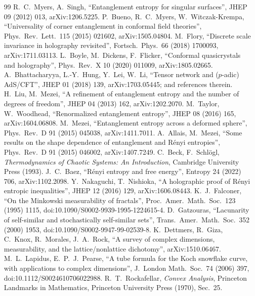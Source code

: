 \documentclass[11pt]{article}
\theoremstyle{definition}\newtheorem{definition}{Definition}[section]
\theoremstyle{remark}\newtheorem*{remark}{Remark}
\begin{document}
\begin{thebibliography}{99}
 R.~C.~Myers, A.~Singh, ``Entanglement entropy for singular surfaces'', JHEP 09 (2012) 013, arXiv:1206.5225.
 P.~Bueno, R.~C.~Myers, W.~Witczak-Krempa, ``Universality of corner entanglement in conformal field theories'', Phys.\ Rev.\ Lett.\ 115 (2015) 021602, arXiv:1505.04804.
 M.~Flory, ``Discrete scale invariance in holography revisited'', Fortsch.\ Phys.\ 66 (2018) 1700093, arXiv:1711.03113.
 L.~Boyle, M.~Dickens, F.~Flicker, ``Conformal quasicrystals and holography'', Phys.\ Rev.\ X 10 (2020) 011009, arXiv:1805.02665.
 A.~Bhattacharyya, L.-Y.~Hung, Y.~Lei, W.~Li, ``Tensor network and ($p$-adic) AdS/CFT'', JHEP 01 (2018) 139, arXiv:1703.05445; and references therein.
 H.~Liu, M.~Mezei, ``A refinement of entanglement entropy and the number of degrees of freedom'', JHEP 04 (2013) 162, arXiv:1202.2070.
 M.~Taylor, W.~Woodhead, ``Renormalized entanglement entropy'', JHEP 08 (2016) 165, arXiv:1604.06808.
 M.~Mezei, ``Entanglement entropy across a deformed sphere'', Phys.\ Rev.\ D 91 (2015) 045038, arXiv:1411.7011.
 A.~Allais, M.~Mezei, ``Some results on the shape dependence of entanglement and R\'enyi entropies'', Phys.\ Rev.\ D 91 (2015) 046002, arXiv:1407.7249.
 C.~Beck, F.~Schl\"ogl, \emph{Thermodynamics of Chaotic Systems: An Introduction}, Cambridge University Press (1993).
 J.~C.~Baez, ``R\'enyi entropy and free energy'', Entropy 24 (2022) 706, arXiv:1102.2098.
 Y.~Nakaguchi, T.~Nishioka, ``A holographic proof of R\'enyi entropic inequalities'', JHEP 12 (2016) 129, arXiv:1606.08443.
 K.~J.~Falconer, ``On the Minkowski measurability of fractals'', Proc.\ Amer.\ Math.\ Soc.\ 123 (1995) 1115, doi:10.1090/S0002-9939-1995-1224615-4.
 D.~Gatzouras, ``Lacunarity of self-similar and stochastically self-similar sets'', Trans.\ Amer.\ Math.\ Soc.\ 352 (2000) 1953, doi:10.1090/S0002-9947-99-02539-8.
 K.~Dettmers, R.~Giza, C.~Knox, R.~Morales, J.~A.~Rock, ``A survey of complex dimensions, measurability, and the lattice/nonlattice dichotomy'', arXiv:1510.06467.
 M.~L.~Lapidus, E.~P.~J.~Pearse, ``A tube formula for the Koch snowflake curve, with applications to complex dimensions'', J.\ London Math.\ Soc.\ 74 (2006) 397, doi:10.1112/S0024610706022988.
 R.~T.~Rockafellar, \emph{Convex Analysis}, Princeton Landmarks in Mathematics, Princeton University Press (1970), Sec.~25.

\end{thebibliography}
\end{document}
